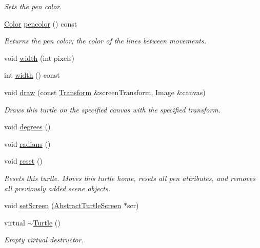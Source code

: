 \begin{DoxyCompactItemize}
\begin{DoxyCompactList}\small\item\em Sets the pen color. \end{DoxyCompactList}\item 
\hyperlink{classcturtle_1_1Color}{Color} \hyperlink{classcturtle_1_1Turtle_ab14dd65bd0e882b815755656072a9cdd}{pencolor} () const
\begin{DoxyCompactList}\small\item\em Returns the pen color; the color of the lines between movements. \end{DoxyCompactList}\item 
void \hyperlink{classcturtle_1_1Turtle_a1b5378167a4425fa721552bab0402afc}{width} (int pixels)
\item 
int \hyperlink{classcturtle_1_1Turtle_af45bb9721decb8f091622863d337e9af}{width} () const
\item 
void \hyperlink{classcturtle_1_1Turtle_aac46b43327830632ac8e505e9d9f3d5f}{draw} (const \hyperlink{classcturtle_1_1Transform}{Transform} \&screen\+Transform, Image \&canvas)
\begin{DoxyCompactList}\small\item\em Draws this turtle on the specified canvas with the specified transform. \end{DoxyCompactList}\item 
void \hyperlink{classcturtle_1_1Turtle_aa68704b24017c6a8cda41ff292ecafde}{degrees} ()
\item 
void \hyperlink{classcturtle_1_1Turtle_a9c266e318f05dc5d45ddbeb830a373fa}{radians} ()
\item 
\mbox{\label{classcturtle_1_1Turtle_abdaaa776015722955a9193bebaaca4b3}} 
void \hyperlink{classcturtle_1_1Turtle_abdaaa776015722955a9193bebaaca4b3}{reset} ()
\begin{DoxyCompactList}\small\item\em Resets this turtle. Moves this turtle home, resets all pen attributes, and removes all previously added scene objects. \end{DoxyCompactList}\item 
void \hyperlink{classcturtle_1_1Turtle_a0f47c7d9a17258780d4d0134daf78522}{set\+Screen} (\hyperlink{classcturtle_1_1AbstractTurtleScreen}{Abstract\+Turtle\+Screen} $\ast$scr)
\item 
\mbox{\label{classcturtle_1_1Turtle_a7224baf1faed4dd203e09522507b9d3b}} 
virtual \hyperlink{classcturtle_1_1Turtle_a7224baf1faed4dd203e09522507b9d3b}{$\sim$\+Turtle} ()
\begin{DoxyCompactList}\small\item\em Empty virtual destructor. \end{DoxyCompactList}\end{DoxyCompactItemize}
